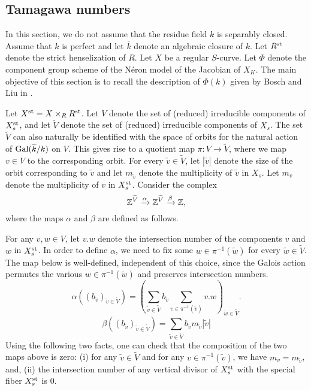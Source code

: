 \subsection{Tamagawa numbers}\label{introtam}
In this section, we do not assume that the residue field $k$ is separably closed. Assume that $k$ is perfect and let $\overline{k}$ denote an algebraic closure of $k$. Let $R^{\textup{st}}$ denote the strict henselization of $R$. Let $X$ be a regular $S$-curve. Let $\Phi$ denote the component group scheme of the N\'{e}ron model of the Jacobian of $X_K$. The main objective of this section is to recall the description of $\Phi(k)$ given by Bosch and Liu in \cite{bosliu}. 

Let $X^{\textup{st}} = X \times_R R^{\textup{st}}$. Let $V$ denote the set of (reduced) irreducible components of $X^{\textup{st}}_s$, and let $\widetilde{V}$ denote the set of (reduced) irreducible components of $X_s$. The set $\widetilde{V}$ can also naturally be identified with the space of orbits for the natural action of $\operatorname{Gal}(\overline{k}/k)$ on $V$. This gives rise to a quotient map $\pi \colon V \rightarrow \widetilde{V}$, where we map $v \in V$ to the corresponding orbit. For every $\tilde{v} \in \widetilde{V}$, let $|\tilde{v}|$ denote the size of the orbit corresponding to $\tilde{v}$ and let $m_{\tilde{v}}$ denote the multiplicity of $\tilde{v}$ in $X_s$. Let $m_v$ denote the multiplicity of $v$ in $X^{\textup{st}}_s$. Consider the complex
\[ \mathbb Z^{\widetilde{V}} \xrightarrow{\alpha} \mathbb Z^{\widetilde{V}} \xrightarrow{\beta} \mathbb Z ,\]
where the maps $\alpha$ and $\beta$ are defined as follows.

For any $v,w \in V$, let $v.w$ denote the intersection number of the components $v$ and $w$ in $X^{\textup{st}}_s$. In order to define $\alpha$, we need to fix some $w \in \pi^{-1}(\tilde{w})$ for every $\tilde{w} \in \widetilde{V}$. The map below is well-defined, independent of this choice, since the Galois action permutes the various $w \in \pi^{-1}(\tilde{w})$ and preserves intersection numbers.
\[
\alpha ((b_{\tilde{v}})_{\tilde{v} \in \widetilde{V}}) = \left( \sum_{\tilde{v} \in \widetilde{V}} b_{\tilde{v}} \sum_{v \in \pi^{-1}(\tilde{v})} v.w \right)_{\tilde{w} \in \widetilde{V}} .
\]
\[ \beta((b_{\tilde{v}})_{\tilde{v} \in \widetilde{V}}) = \sum_{\tilde{v} \in \widetilde{V}} b_{\tilde{v}} m_{\tilde{v}} |\tilde{v}| \]
Using the following two facts, one can check that the composition of the two maps above is zero: (i) for any $\tilde{v} \in \widetilde{V}$ and for any $v \in \pi^{-1}(\tilde{v})$, we have $m_v = m_{\tilde{v}}$, and,  (ii) the intersection number of any vertical divisor of $X^{\textup{st}}_s$ with the special fiber $X^{\textup{st}}_s$ is $0$.

